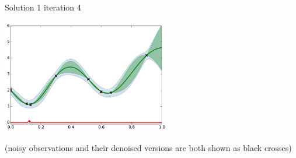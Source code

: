 \begin{frame}[noframenumbering]{Solution 1}
iteration 4
\begin{center}
\includegraphics[height=5cm]{4_optimization/figures/python/ego_EI1n4}
\end{center}
\tiny (noisy observations and their denoised versions are both shown as black crosses)\\
\end{frame}




